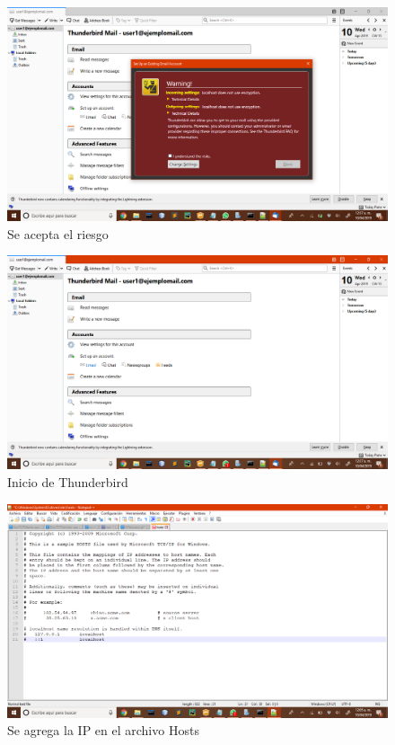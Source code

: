 \begin{figure}[H]
    \centering
    \includegraphics[scale=.30]{imagenes/primero/AceptarRiesgo.png}
    \caption{Se acepta el riesgo}
    \label{fig:smtp23}
\end{figure}

\begin{figure}[H]
    \centering
    \includegraphics[scale=.30]{imagenes/primero/InicioThunderbird.png}
    \caption{Inicio de Thunderbird}
    \label{fig:smtp24}
\end{figure}

\begin{figure}[H]
    \centering
    \includegraphics[scale=.30]{imagenes/primero/AgregarIP.png}
    \caption{Se agrega la IP en el archivo Hosts}
    \label{fig:smtp25}
\end{figure}

